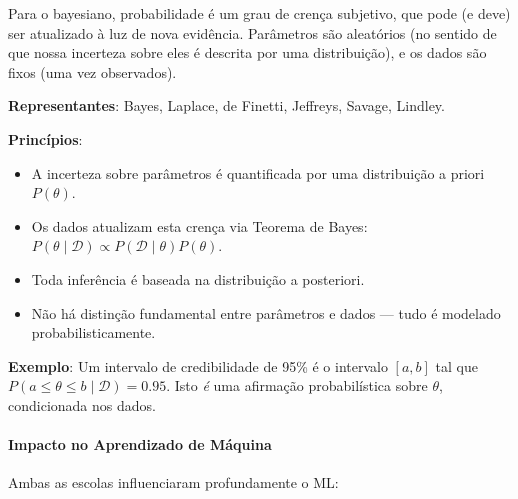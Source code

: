 \documentclass{tufte-handout}
\begin{document}
Para o bayesiano, probabilidade é um grau de crença subjetivo, que pode (e deve) ser
atualizado à luz de nova evidência. Parâmetros são aleatórios (no sentido de que nossa
incerteza sobre eles é descrita por uma distribuição), e os dados são fixos
(uma vez observados).

\textbf{Representantes}: Bayes, Laplace, de Finetti, Jeffreys, Savage, Lindley.

\textbf{Princípios}:
\begin{itemize}
    \item A incerteza sobre parâmetros é quantificada por uma distribuição a priori $P(\theta)$.
    \item Os dados atualizam esta crença via Teorema de Bayes: $P(\theta \mid \mathcal{D}) \propto P(\mathcal{D} \mid \theta) P(\theta)$.
    \item Toda inferência é baseada na distribuição a posteriori.
    \item Não há distinção fundamental entre parâmetros e dados --- tudo é modelado probabilisticamente.
\end{itemize}

\textbf{Exemplo}: Um intervalo de credibilidade de 95\% é o intervalo $[a, b]$ tal que
$P(a \le \theta \le b \mid \mathcal{D}) = 0.95$. Isto \textit{é} uma afirmação
probabilística sobre $\theta$, condicionada nos dados.

\paragraph{Impacto no Aprendizado de Máquina}

Ambas as escolas influenciaram profundamente o ML:

\begin{marginfigure}
\caption{Relação entre prior, verossimilhança e posterior no Teorema de Bayes.}
\end{marginfigure}
\end{document}
